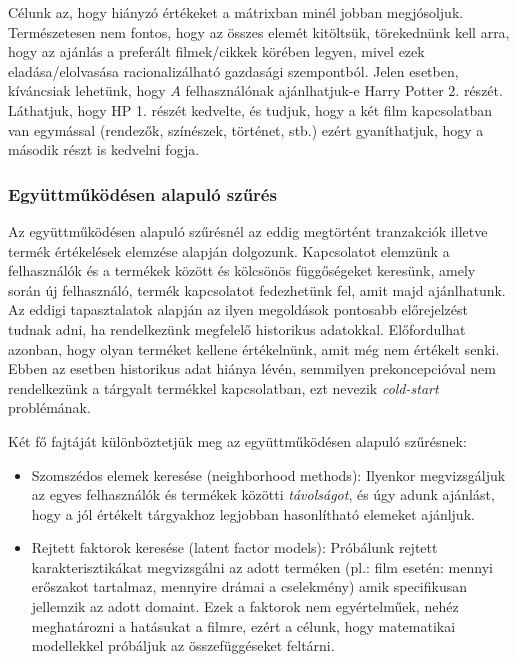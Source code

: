 \documentclass[a4paper,12pt]{article}
\begin{document}
Célunk az, hogy hiányzó értékeket a mátrixban minél jobban megjósoljuk. Természetesen nem fontos, hogy az összes elemét kitöltsük, törekednünk kell arra, hogy az ajánlás a preferált filmek/cikkek körében legyen, mivel ezek eladása/elolvasása racionalizálható gazdasági szempontból. Jelen esetben, kíváncsiak lehetünk, hogy $A$ felhasználónak ajánlhatjuk-e Harry Potter 2. részét. Láthatjuk, hogy HP 1. részét kedvelte, és tudjuk, hogy a két film kapcsolatban van egymással (rendezők, színészek, történet, stb.) ezért gyaníthatjuk, hogy a második részt is kedvelni fogja.

\subsubsection{Együttműködésen alapuló szűrés}

Az együttműködésen alapuló szűrésnél az eddig megtörtént tranzakciók illetve termék értékelések elemzése alapján dolgozunk\cite{korenmf}. Kapcsolatot elemzünk a felhasználók és a termékek között és kölcsönös függőségeket keresünk, amely során új felhasználó, termék kapcsolatot fedezhetünk fel, amit majd ajánlhatunk. Az eddigi tapasztalatok alapján az ilyen megoldások pontosabb előrejelzést tudnak adni, ha rendelkezünk megfelelő historikus adatokkal. Előfordulhat azonban, hogy olyan terméket kellene értékelnünk, amit még nem értékelt senki. Ebben az esetben historikus adat hiánya lévén, semmilyen prekoncepcióval nem rendelkezünk a tárgyalt termékkel kapcsolatban, ezt nevezik \textsl{cold-start} problémának.\newline

Két fő fajtáját különböztetjük meg az együttműködésen alapuló szűrésnek:
\begin{itemize}
\item Szomszédos elemek keresése (neighborhood methods): Ilyenkor megvizsgáljuk az egyes felhasználók és termékek közötti \textsl{távolságot}, és úgy adunk ajánlást, hogy a jól értékelt tárgyakhoz legjobban hasonlítható elemeket ajánljuk.
\item Rejtett faktorok keresése (latent factor models): Próbálunk rejtett karakterisztikákat megvizsgálni az adott terméken (pl.: film esetén: mennyi erőszakot tartalmaz, mennyire drámai a cselekmény) amik specifikusan jellemzik az adott domaint. Ezek a faktorok nem egyértelműek, nehéz meghatározni a hatásukat a filmre, ezért a célunk, hogy matematikai modellekkel próbáljuk az összefüggéseket feltárni. 
\end{itemize}
\end{document}
